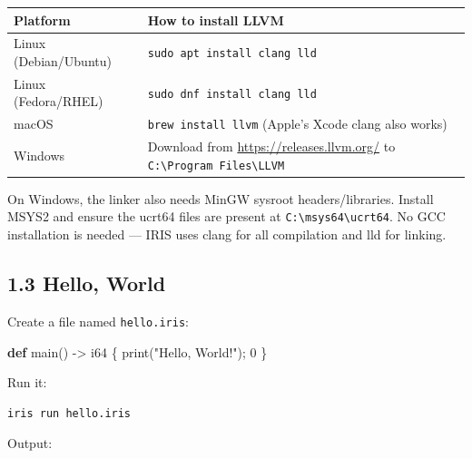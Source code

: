 \documentclass[
  english,
]{book}
\newenvironment{Shaded}{\begin{snugshade}}{\end{snugshade}}
\newcommand{\DataTypeTok}[1]{\textcolor[rgb]{0.31,0.79,0.69}{#1}}
\newcommand{\DecValTok}[1]{\textcolor[rgb]{0.71,0.81,0.66}{#1}}
\newcommand{\FunctionTok}[1]{\textcolor[rgb]{0.86,0.86,0.67}{#1}}
\newcommand{\KeywordTok}[1]{\textcolor[rgb]{0.34,0.61,0.84}{\textbf{#1}}}
\newcommand{\NormalTok}[1]{\textcolor[rgb]{0.83,0.83,0.83}{#1}}
\newcommand{\OperatorTok}[1]{\textcolor[rgb]{0.83,0.83,0.83}{#1}}
\newcommand{\StringTok}[1]{\textcolor[rgb]{0.81,0.57,0.47}{#1}}
\begin{document}
\begin{longtable}[]{@{}
  >{\raggedright\arraybackslash}p{}
  >{\raggedright\arraybackslash}p{}@{}}
\toprule\noalign{}
\begin{minipage}[b]{\linewidth}\raggedright
Platform
\end{minipage} & \begin{minipage}[b]{\linewidth}\raggedright
How to install LLVM
\end{minipage} \\
\midrule\noalign{}
\endhead
\bottomrule\noalign{}
\endlastfoot
Linux (Debian/Ubuntu) & \texttt{sudo\ apt\ install\ clang\ lld} \\
Linux (Fedora/RHEL) & \texttt{sudo\ dnf\ install\ clang\ lld} \\
macOS & \texttt{brew\ install\ llvm} (Apple's Xcode clang also works) \\
Windows & Download from \url{https://releases.llvm.org/} to
\texttt{C:\textbackslash{}Program\ Files\textbackslash{}LLVM} \\
\end{longtable}

On Windows, the linker also needs MinGW sysroot headers/libraries.
Install MSYS2 and ensure the ucrt64 files are present at
\texttt{C:\textbackslash{}msys64\textbackslash{}ucrt64}. No GCC
installation is needed --- IRIS uses clang for all compilation and lld
for linking.

\subsection{1.3 Hello, World}\label{hello-world}

Create a file named \texttt{hello.iris}:

\begin{Shaded}
\begin{Highlighting}[]
\KeywordTok{def}\NormalTok{ main() }\OperatorTok{{-}\textgreater{}} \DataTypeTok{i64}\NormalTok{ \{}
    \FunctionTok{print}\NormalTok{(}\StringTok{"Hello, World!"}\NormalTok{);}
    \DecValTok{0}
\NormalTok{\}}
\end{Highlighting}
\end{Shaded}

Run it:

\begin{verbatim}
iris run hello.iris
\end{verbatim}

Output:
\end{document}
